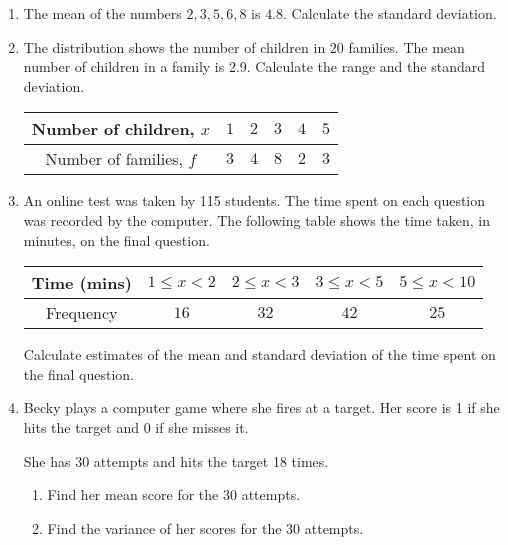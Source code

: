 \begin{enumerate}
	\item The mean of the numbers $2,3,5,6,8$ is $4.8$. Calculate the standard deviation.
	
	\item  The distribution shows the number of children in $20$ families. The mean number of children in a family is 2.9. Calculate  the range and the standard deviation.
	
		\medskip
	
	\renewcommand{\arraystretch}{1.2} %
	\begin{tabular}{|c|c|c|c|c|c|}
		\hline
		Number of children, $x$ & $ 1$ & $2$ & $3$ & $4$ & $5$ \\ 
		\hline
		Number of families, $f$ & $3$ & $4$ & $8$ & $2$ & $3$ \\ 
		\hline
	\end{tabular}
	
	\smallskip
	
	
	\item  An online test was taken by 115 students. The time spent on each question was recorded by the computer. The following table shows the time taken, in minutes, on the final question.
		\medskip
	
	\renewcommand{\arraystretch}{1.2} %
	\begin{tabular}{|c|c|c|c|c|}
		\hline
		Time (mins) &  $1\leq x <2$ & $2\leq x <3$ & $3\leq x <5$ & $5\leq x <10$  \\ 
		\hline
		Frequency & $16$ & $32$ & $42$ & $25$  \\ 
		\hline
	\end{tabular}
	
	\smallskip
	
	Calculate estimates of the mean and standard deviation of the time spent on the final question.
	
	\item Becky plays a computer game where she fires at a target. Her score is 1 if she hits the target and 0 if she misses it.
	
	She has 30 attempts and hits the target 18 times.
	
	\begin{enumerate}
		\item Find her mean score for the 30 attempts.
		\item Find the variance of her scores for the 30 attempts.
	\end{enumerate} 
	
	
\end{enumerate}


